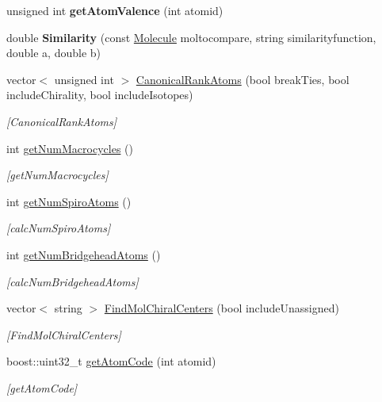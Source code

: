 \begin{DoxyCompactItemize}
unsigned int {\bfseries get\+Atom\+Valence} (int atomid)
\item 
\mbox{\label{class_molecule_a43f990a0c0e9f3952c4a1e2f0ba75117}} 
double {\bfseries Similarity} (const \mbox{\hyperlink{class_molecule}{Molecule}} moltocompare, string similarityfunction, double a, double b)
\item 
vector$<$ unsigned int $>$ \mbox{\hyperlink{class_molecule_abc491241d48487fac42166ff81c0289c}{Canonical\+Rank\+Atoms}} (bool break\+Ties, bool include\+Chirality, bool include\+Isotopes)
\begin{DoxyCompactList}\small\item\em \mbox{[}Canonical\+Rank\+Atoms\mbox{]} \end{DoxyCompactList}\item 
int \mbox{\hyperlink{class_molecule_a7ae4c6e9458d7874bf43bdfbe079d875}{get\+Num\+Macrocycles}} ()
\begin{DoxyCompactList}\small\item\em \mbox{[}get\+Num\+Macrocycles\mbox{]} \end{DoxyCompactList}\item 
int \mbox{\hyperlink{class_molecule_ab418ce9c2222f00552c847a14499e282}{get\+Num\+Spiro\+Atoms}} ()
\begin{DoxyCompactList}\small\item\em \mbox{[}calc\+Num\+Spiro\+Atoms\mbox{]} \end{DoxyCompactList}\item 
int \mbox{\hyperlink{class_molecule_a9d22135d69888e8d269ac5384a424f83}{get\+Num\+Bridgehead\+Atoms}} ()
\begin{DoxyCompactList}\small\item\em \mbox{[}calc\+Num\+Bridgehead\+Atoms\mbox{]} \end{DoxyCompactList}\item 
vector$<$ string $>$ \mbox{\hyperlink{class_molecule_a9befce09a7221276f628c79d28d6758f}{Find\+Mol\+Chiral\+Centers}} (bool include\+Unassigned)
\begin{DoxyCompactList}\small\item\em \mbox{[}Find\+Mol\+Chiral\+Centers\mbox{]} \end{DoxyCompactList}\item 
boost\+::uint32\+\_\+t \mbox{\hyperlink{class_molecule_a4123cb22770fc42287562a16affa5ba5}{get\+Atom\+Code}} (int atomid)
\begin{DoxyCompactList}\small\item\em \mbox{[}get\+Atom\+Code\mbox{]} \end{DoxyCompactList}\item 

\end{DoxyCompactItemize}
